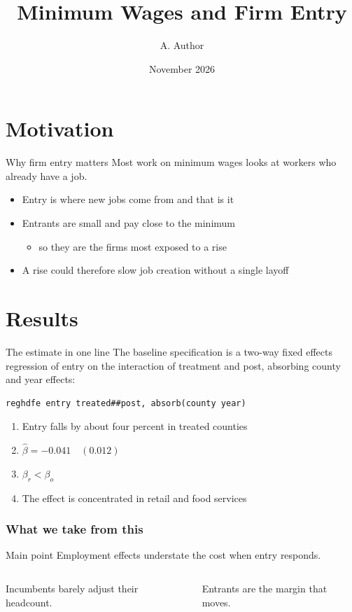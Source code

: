 \documentclass[aspectratio=169]{beamer}
\title{Minimum Wages and Firm Entry}
\author{A. Author}
\date{November 2026}
\begin{document}
\frame{\titlepage}

\section{Motivation}

\begin{frame}{Why firm entry matters}
Most work on minimum wages looks at workers who already have a job.

\begin{itemize}
  \item<1-> Entry is where new jobs come from and that is it
  \item<2-> Entrants are small and pay close to the minimum
    \begin{itemize}
      \item so they are the firms most exposed to a rise
    \end{itemize}
  \item<3-> A rise could therefore slow job creation without a single layoff
\end{itemize}
\end{frame}



\section{Results}

\begin{frame}[fragile]{The estimate in one line} %
The baseline specification is a two-way fixed effects regression of entry on
the interaction of treatment and post, absorbing county and year effects:

\begin{verbatim}
reghdfe entry treated##post, absorb(county year)
\end{verbatim}

\begin{enumerate}
  \item Entry falls by about four percent in treated counties
  \item $\hat\beta = -0.041 \quad (0.012)$
  \item $\beta_{r} < \beta_{o}$
  \item The effect is concentrated in retail and food services
\end{enumerate}
\end{frame}

\begin{frame}
\frametitle{What we take from this}
\begin{block}{Main point}
Employment effects understate the cost when entry responds.
\end{block}

\begin{columns}
Incumbents barely adjust their headcount.

Entrants are the margin that moves. %
\end{columns}
\end{frame}
\end{document}
